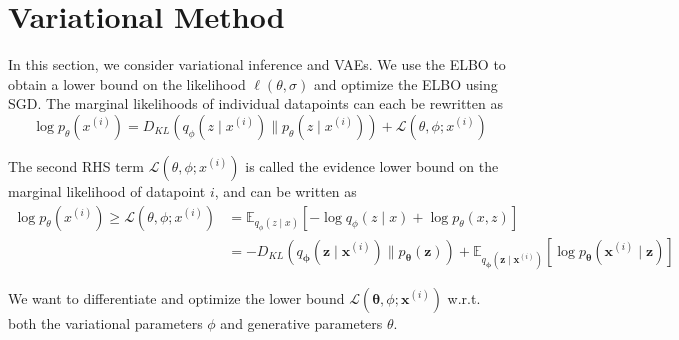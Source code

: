\section{Variational Method}
In this section, we consider variational inference and VAEs. We use the ELBO to obtain a lower bound on the likelihood $\ell(\theta, \sigma)$ and optimize the ELBO using SGD. The marginal likelihoods of individual datapoints can each be rewritten as
\begin{equation*}
\log p_{\theta}\left(x^{(i)}\right)=D_{K L}\left(q_{\phi}\left(z \mid x^{(i)}\right) \| p_{\theta}\left(z \mid x^{(i)} \right)\right)+ \mathcal{L}\left(\theta, \phi ; x^{(i)} \right)
\end{equation*}

The second RHS term $\mathcal{L} \left(\theta, \phi ; x^{(i)} \right)$ is called the evidence lower bound on the marginal likelihood of datapoint $i$, and can be written as
\begin{equation*}
\begin{aligned}
\log p_{\theta}\left(x^{(i)}\right) \geq \mathcal{L}\left(\theta, \phi ;x^{(i)}\right)&=\mathbb{E}_{q_{\phi}(z \mid x)}\left[-\log q_{\phi}(z \mid x)+\log p_{\theta}(x, z)\right] \\
&=-D_{KL}\left(q_{\boldsymbol{\phi}}\left(\mathbf{z} \mid \mathbf{x}^{(i)}\right) \| p_{\boldsymbol{\theta}}(\mathbf{z})\right)+\mathbb{E}_{q_{\boldsymbol{\phi}}\left(\mathbf{z} \mid \mathbf{x}^{(i)}\right)}\left[\log p_{\boldsymbol{\theta}}\left(\mathbf{x}^{(i)} \mid \mathbf{z}\right)\right]
\end{aligned}
\end{equation*}

We want to differentiate and optimize the lower bound $\mathcal{L}\left(\boldsymbol{\theta}, \phi ; \mathbf{x}^{(i)}\right)$ w.r.t. both the variational parameters $\phi$ and generative parameters $\theta$.
